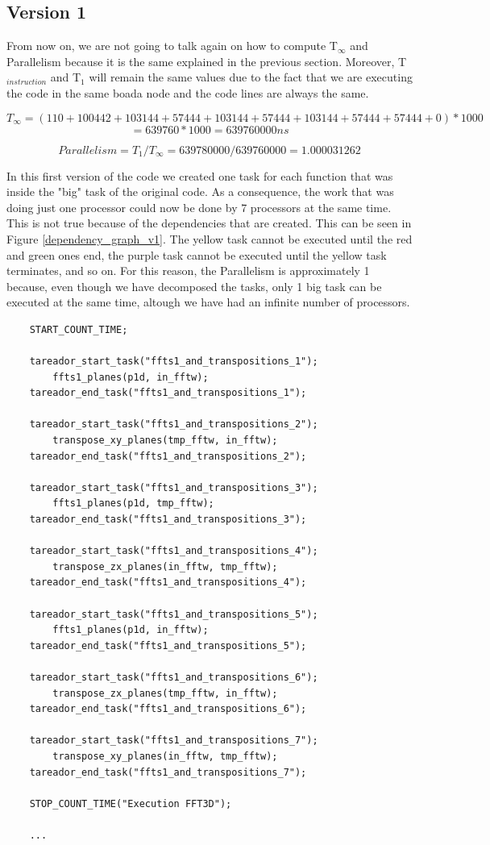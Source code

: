 \documentclass[12pt, a4paper]{article}
\begin{document}
\subsection{Version 1}

From now on, we are not going to talk again on how to compute T$_\infty$ and Parallelism because it is the same explained in the previous section. Moreover, T$_{instruction}$ and T$_1$ will remain the same values due to the fact that we are executing the code in the same boada node and the code lines are always the same.

\[ T_\infty = (110 + 100442 + 103144 + 57444 + 103144 + 57444 + 103144 + 57444 + 57444 + 0) * 1000 \]
\[ =  639760 * 1000 = 639760000 ns \]


\[ Parallelism = T_1/T_\infty = 639780000/639760000 = 1.000031262 \]

In this first version of the code we created one task for each function that was inside the "big" task of the original code. As a consequence, the work that was doing just one processor could now be done by 7 processors at the same time. This is not true because of the dependencies that are created. This can be seen in Figure \ref{dependency_graph_v1}. The yellow task cannot be executed until the red and green ones end, the purple task cannot be executed until the yellow task terminates, and so on. For this reason, the Parallelism is approximately 1 because, even though we have decomposed the tasks, only 1 big task can be executed at the same time, altough we have had an infinite number of processors.

\begin{lstlisting}
    START_COUNT_TIME;

    tareador_start_task("ffts1_and_transpositions_1");
        ffts1_planes(p1d, in_fftw);
    tareador_end_task("ffts1_and_transpositions_1");

    tareador_start_task("ffts1_and_transpositions_2");
        transpose_xy_planes(tmp_fftw, in_fftw);
    tareador_end_task("ffts1_and_transpositions_2");

    tareador_start_task("ffts1_and_transpositions_3");
        ffts1_planes(p1d, tmp_fftw);
    tareador_end_task("ffts1_and_transpositions_3");

    tareador_start_task("ffts1_and_transpositions_4");
        transpose_zx_planes(in_fftw, tmp_fftw);
    tareador_end_task("ffts1_and_transpositions_4");

    tareador_start_task("ffts1_and_transpositions_5");
        ffts1_planes(p1d, in_fftw);
    tareador_end_task("ffts1_and_transpositions_5");

    tareador_start_task("ffts1_and_transpositions_6");
        transpose_zx_planes(tmp_fftw, in_fftw);
    tareador_end_task("ffts1_and_transpositions_6");

    tareador_start_task("ffts1_and_transpositions_7");
        transpose_xy_planes(in_fftw, tmp_fftw);
    tareador_end_task("ffts1_and_transpositions_7");
     
    STOP_COUNT_TIME("Execution FFT3D");
    
    ...
\end{lstlisting}
\end{document}

